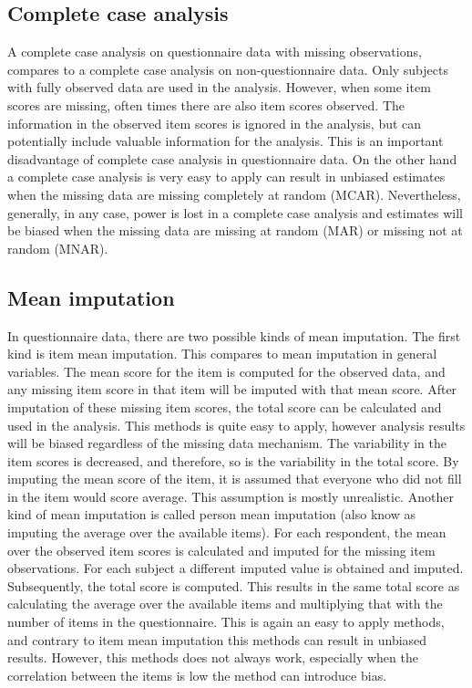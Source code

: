 \documentclass[
]{book}
\begin{document}
\hypertarget{complete-case-analysis}{%
\subsection{Complete case analysis}\label{complete-case-analysis}}

A complete case analysis on questionnaire data with missing observations, compares to a complete case analysis on non-questionnaire data. Only subjects with fully observed data are used in the analysis. However, when some item scores are missing, often times there are also item scores observed. The information in the observed item scores is ignored in the analysis, but can potentially include valuable information for the analysis. This is an important disadvantage of complete case analysis in questionnaire data. On the other hand a complete case analysis is very easy to apply can result in unbiased estimates when the missing data are missing completely at random (MCAR). Nevertheless, generally, in any case, power is lost in a complete case analysis and estimates will be biased when the missing data are missing at random (MAR) or missing not at random (MNAR).

\hypertarget{mean-imputation-1}{%
\subsection{Mean imputation}\label{mean-imputation-1}}

In questionnaire data, there are two possible kinds of mean imputation. The first kind is item mean imputation. This compares to mean imputation in general variables. The mean score for the item is computed for the observed data, and any missing item score in that item will be imputed with that mean score. After imputation of these missing item scores, the total score can be calculated and used in the analysis. This methods is quite easy to apply, however analysis results will be biased regardless of the missing data mechanism. The variability in the item scores is decreased, and therefore, so is the variability in the total score. By imputing the mean score of the item, it is assumed that everyone who did not fill in the item would score average. This assumption is mostly unrealistic.
Another kind of mean imputation is called person mean imputation (also know as imputing the average over the available items). For each respondent, the mean over the observed item scores is calculated and imputed for the missing item observations. For each subject a different imputed value is obtained and imputed. Subsequently, the total score is computed. This results in the same total score as calculating the average over the available items and multiplying that with the number of items in the questionnaire. This is again an easy to apply methods, and contrary to item mean imputation this methods can result in unbiased results. However, this methods does not always work, especially when the correlation between the items is low the method can introduce bias.
\end{document}
